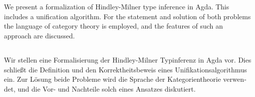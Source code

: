 \restoregeometry

\cleardoublepage




\let\raggedsection\centering
\section*{\abstractname}
We present a formalization of Hindley-Milner type inference in Agda.
This includes a unification algorithm. For the statement and solution
of both problems the language of category theory is employed, and
the features of such an approach are discussed.

\begin{otherlanguage}{ngerman} 
  \section*{\abstractname}
  Wir stellen eine Formalisierung der Hindley-Milner Typinferenz in Agda vor.
  Dies schließt die Definition und den Korrektheitsbeweis eines
  Unifikationsalgorithmus ein. Zur Lösung beide Probleme wird
  die Sprache der Kategorientheorie verwendet, und die Vor- und
  Nachteile solch eines Ansatzes diskutiert.
\end{otherlanguage}

\let\raggedsection\raggedright





